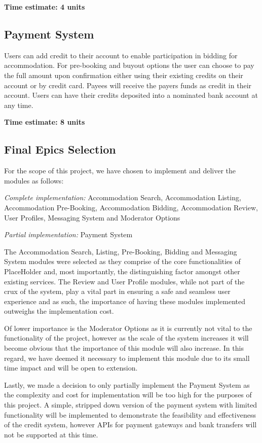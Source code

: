 \documentclass[12pt,a4paper]{article}
\begin{document}
\textbf{Time estimate: 4 units}

\subsection *{Payment System}

Users can add credit to their account to enable participation in bidding for accommodation. For pre-booking and buyout options the user can choose to pay the full amount upon confirmation either using their existing credits on their account or by credit card. Payees will receive the payers funds as credit in their account. Users can have their credits deposited into a nominated bank account at any time.

\textbf{Time estimate: 8 units}

\subsection *{Final Epics Selection}

For the scope of this project, we have chosen to implement and deliver the modules as follows:

\emph{Complete implementation:} Accommodation Search, Accommodation Listing, Accommodation Pre-Booking, Accommodation Bidding, Accommodation Review, User Profiles, Messaging System and Moderator Options

\emph{Partial implementation:} Payment System

The Accommodation Search, Listing, Pre-Booking, Bidding and Messaging System modules were selected as they comprise of the core functionalities of PlaceHolder and, most importantly, the distinguishing factor amongst other existing services. The Review and User Profile modules, while not part of the crux of the system, play a vital part in ensuring a safe and seamless user experience and as such, the importance of having these modules implemented outweighs the implementation cost.

Of lower importance is the Moderator Options as it is currently not vital to the functionality of the project, however as the scale of the system increases it will become obvious that the importance of this module will also increase. In this regard, we have deemed it necessary to implement this module due to its small time impact and will be open to extension.

Lastly, we made a decision to only partially implement the Payment System as the complexity and cost for implementation will be too high for the purposes of this project. A simple, stripped down version of the payment system with limited functionality will be implemented to demonstrate the feasibility and effectiveness of the credit system, however APIs for payment gateways and bank transfers will not be supported at this time.
\end{document}
